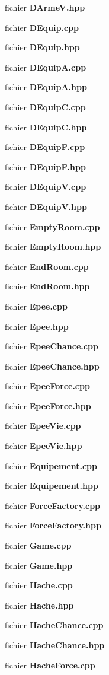 \begin{DoxyCompactItemize}
fichier {\bf D\-Arme\-V.\-hpp}
\item 
fichier {\bf D\-Equip.\-cpp}
\item 
fichier {\bf D\-Equip.\-hpp}
\item 
fichier {\bf D\-Equip\-A.\-cpp}
\item 
fichier {\bf D\-Equip\-A.\-hpp}
\item 
fichier {\bf D\-Equip\-C.\-cpp}
\item 
fichier {\bf D\-Equip\-C.\-hpp}
\item 
fichier {\bf D\-Equip\-F.\-cpp}
\item 
fichier {\bf D\-Equip\-F.\-hpp}
\item 
fichier {\bf D\-Equip\-V.\-cpp}
\item 
fichier {\bf D\-Equip\-V.\-hpp}
\item 
fichier {\bf Empty\-Room.\-cpp}
\item 
fichier {\bf Empty\-Room.\-hpp}
\item 
fichier {\bf End\-Room.\-cpp}
\item 
fichier {\bf End\-Room.\-hpp}
\item 
fichier {\bf Epee.\-cpp}
\item 
fichier {\bf Epee.\-hpp}
\item 
fichier {\bf Epee\-Chance.\-cpp}
\item 
fichier {\bf Epee\-Chance.\-hpp}
\item 
fichier {\bf Epee\-Force.\-cpp}
\item 
fichier {\bf Epee\-Force.\-hpp}
\item 
fichier {\bf Epee\-Vie.\-cpp}
\item 
fichier {\bf Epee\-Vie.\-hpp}
\item 
fichier {\bf Equipement.\-cpp}
\item 
fichier {\bf Equipement.\-hpp}
\item 
fichier {\bf Force\-Factory.\-cpp}
\item 
fichier {\bf Force\-Factory.\-hpp}
\item 
fichier {\bf Game.\-cpp}
\item 
fichier {\bf Game.\-hpp}
\item 
fichier {\bf Hache.\-cpp}
\item 
fichier {\bf Hache.\-hpp}
\item 
fichier {\bf Hache\-Chance.\-cpp}
\item 
fichier {\bf Hache\-Chance.\-hpp}
\item 
fichier {\bf Hache\-Force.\-cpp}
\item 

\end{DoxyCompactItemize}
